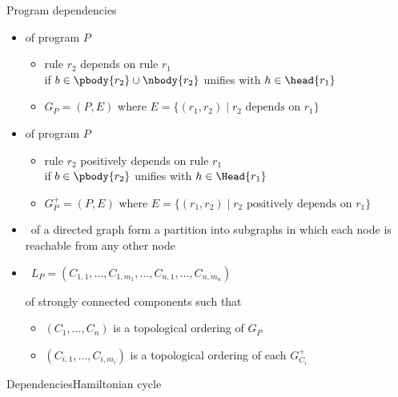 \begin{frame}{Program dependencies}
  \smallskip
  \begin{itemize}
  \item<1->  of program \(P\)
    \begin{itemize}\normalsize
    \item<only@-2> rule \(r_2\) \alert{depends} on rule \(r_1\)
      \\if \(b\in\pbody{r_2}\cup\nbody{r_2}\) unifies with \(h\in\head{r_1}\)
      \smallskip
    \item \(G_P=(P,E)\) where \(E=\{ (r_1,r_2) \mid r_2 \text{ depends on } r_1 \}\)
    \end{itemize}
    \medskip
  \item<2->  of program \(P\)
    \begin{itemize}\normalsize
    \item<only@-2> rule \(r_2\) \alert{positively depends} on rule \(r_1\)
      \\if \(b\in\pbody{r_2}\) unifies with \(h\in\Head{r_1}\)
      \smallskip
    \item \(G^+_P=(P,E)\) where \(E=\{ (r_1,r_2) \mid r_2 \text{ positively depends on } r_1 \}\)
    \end{itemize}
    \medskip
  \item<only@4->  \ of a directed graph form a partition into subgraphs
    in which each node is reachable from any other node
    \medskip
  \item<only@5->  \  \(L_P = (C_{1,1},\dots,C_{1,m_1},\dots,C_{n,1},\dots,C_{n,m_n})\)
    \par
    of strongly connected components
    such that
    \begin{itemize}\normalsize
    \item \((C_1,\dots,C_n)\) is a topological ordering of \(G_P\)
      \smallskip
    \item \((C_{i,1},\dots,C_{i,m_i})\) is a topological ordering of each \(G^+_{C_i}\)
    \end{itemize}
  \end{itemize}
\end{frame}
\begin{frame}[shrink]{Dependencies}{Hamiltonian cycle}
  \begin{center}
    \DepGraph
  \end{center}
\end{frame}
